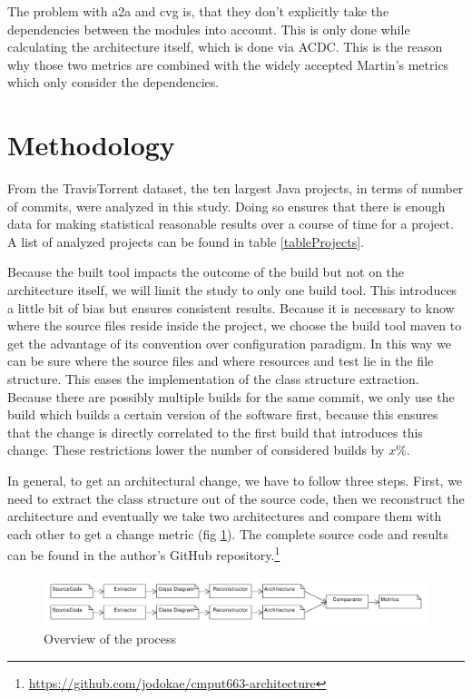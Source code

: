 \documentclass[conference]{IEEEtran}
\begin{document}
The problem with a2a and cvg is, that they don't explicitly take the dependencies between the modules into account. This is only done while calculating the architecture itself, which is done via ACDC. This is the reason why those two metrics are combined with the widely accepted Martin's metrics which only consider the dependencies.

\section{Methodology}

From the TravisTorrent dataset, the ten largest Java projects, in terms of number of commits, were analyzed in this study. Doing so ensures that there is enough data for making statistical reasonable results over a course of time for a project. A list of analyzed projects can be found in table \ref{tableProjects}.

Because the built tool impacts the outcome of the build but not on the architecture itself, we will limit the study to only one build tool. This introduces a little bit of bias but ensures consistent results. Because it is necessary to know where the source files reside inside the project, we choose the build tool maven to get the advantage of its convention over configuration paradigm. In this way we can be sure where the source files and where resources and test lie in the file structure. This eases the implementation of the class structure extraction. 
Because there are possibly multiple builds for the same commit, we only use the build which builds a certain version of the software first, because this ensures that the change is directly correlated to the first build that introduces this change. These restrictions lower the number of considered builds by $x\%$. 

In general, to get an architectural change, we have to follow three steps. First, we need to extract the class structure out of the source code, then we reconstruct the architecture and eventually we take two architectures and compare them with each other to get a change metric (fig \ref{overview}). The complete source code and results can be found in the author's GitHub repository.\footnote{\url{https://github.com/jodokae/cmput663-architecture}}

\begin{figure}
	\centering
	\includegraphics[width=7in]{assets/overview.pdf}
	\caption{Overview of the process}
	\label{overview}
\end{figure}
\end{document}

